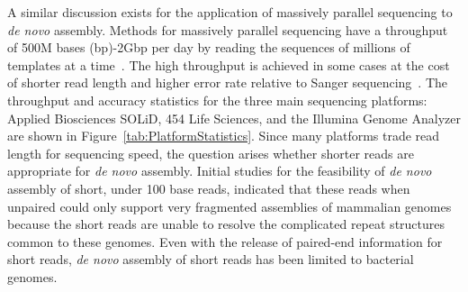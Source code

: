 \documentclass{article}
\begin{document}
A similar discussion exists for the application of massively parallel
sequencing to \textit{de novo} assembly.  Methods for massively
parallel sequencing have a throughput of 500M bases (bp)-2Gbp per day by
reading the sequences of millions of templates at a
time~\cite{Shendure2008}.  The high throughput is achieved in some
cases at the cost of shorter read length and higher error rate
relative to Sanger sequencing~\cite{Pettersson2009}.  The throughput
and accuracy statistics for the three main sequencing platforms:
Applied Biosciences SOLiD, 454 Life Sciences, and the Illumina Genome
Analyzer are shown in Figure~\ref{tab:PlatformStatistics}.  Since many
platforms trade read length for sequencing speed, the question arises
whether shorter reads are appropriate for \textit{de novo} assembly.
Initial studies for the feasibility of \textit{de novo} assembly of
short, under 100 base reads, indicated that these reads when unpaired
could only support very fragmented assemblies of mammalian
genomes~\cite{Chaisson2004, Whiteford2005} because the short reads are
unable to resolve the complicated repeat structures common to these
genomes.  Even with the release of paired-end information for short
reads, \textit{de novo} assembly of short reads has been limited to
bacterial genomes.
\end{document}
